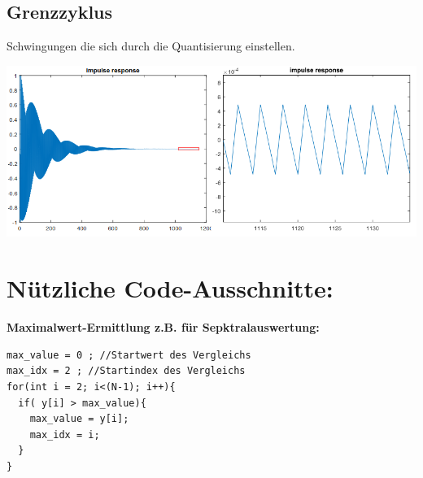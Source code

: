 \documentclass[10pt,a4paper]{article}
\begin{document}
\subsection{Grenzzyklus}
Schwingungen die sich durch die Quantisierung einstellen.
\begin{center}
    \includegraphics[width=.4\textwidth]{./img/grenzzyklus.png}
\end{center}

\section{Nützliche Code-Ausschnitte:}
\textbf{Maximalwert-Ermittlung z.B. für Sepktralauswertung:}
\begin{verbatim}
max_value = 0 ; //Startwert des Vergleichs
max_idx = 2 ; //Startindex des Vergleichs
for(int i = 2; i<(N-1); i++){ 
  if( y[i] > max_value){
    max_value = y[i];
    max_idx = i;
  }
}
\end{verbatim}
\end{document}

